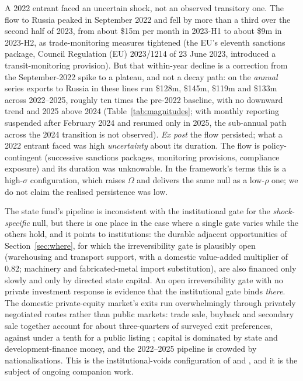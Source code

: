 \documentclass[12pt]{article}
\begin{document}
A 2022 entrant faced an uncertain shock, not an observed transitory one. The flow to Russia
peaked in September 2022 and fell by more than a third over the second half of 2023, from
about \$15m per month in 2023-H1 to about \$9m in 2023-H2, as trade-monitoring measures
tightened (the EU's eleventh sanctions package, Council Regulation (EU) 2023/1214 of 23 June
2023, introduced a transit-monitoring provision). But that within-year decline is a correction
from the September-2022 spike to a plateau, and not a decay path: on the \emph{annual} series
exports to Russia in these lines run \$128m, \$145m, \$119m and \$133m across 2022--2025,
roughly ten times the pre-2022 baseline, with no downward trend and 2025 above 2024
(Table~\ref{tab:magnitudes}; with monthly reporting suspended after February 2024 and resumed
only in 2025, the sub-annual path across the 2024 transition is not observed). \emph{Ex post} the flow
persisted; what a 2022 entrant faced was high \emph{uncertainty} about its duration. The flow
is policy-contingent (successive sanctions packages, monitoring provisions, compliance
exposure) and its duration was unknowable. In the framework's terms this is a high-$\sigma$
configuration, which raises $\Omega$ and delivers the same null as a low-$\rho$ one; we do not
claim the realised persistence was low.

The state fund's pipeline
is inconsistent with the institutional gate for the \emph{shock-specific} null, but there is one place in
the case where a single gate varies while the others hold, and it points to institutions: the
durable adjacent opportunities of Section~\ref{sec:where}, for which the irreversibility gate
is plausibly open (warehousing and transport support, with a domestic value-added multiplier
of 0.82; machinery and fabricated-metal import substitution), are also financed only slowly
and only by directed state capital. An open irreversibility gate with no private investment
response is evidence that the institutional gate binds \emph{there}. The domestic
private-equity market's exits run overwhelmingly through privately negotiated routes rather
than public markets: trade sale, buyback and secondary sale together account for about
three-quarters of surveyed exit preferences, against under a tenth for a public listing
\citep{qicaifcifc2026pe}; capital is dominated by state and
development-finance money, and the 2022--2025 pipeline is crowded by nationalisations. This is
the institutional-voids configuration of \citet{khannapalepu2000} and \citet{rajanzingales1998}, and
it is the subject of ongoing companion work.
\end{document}
